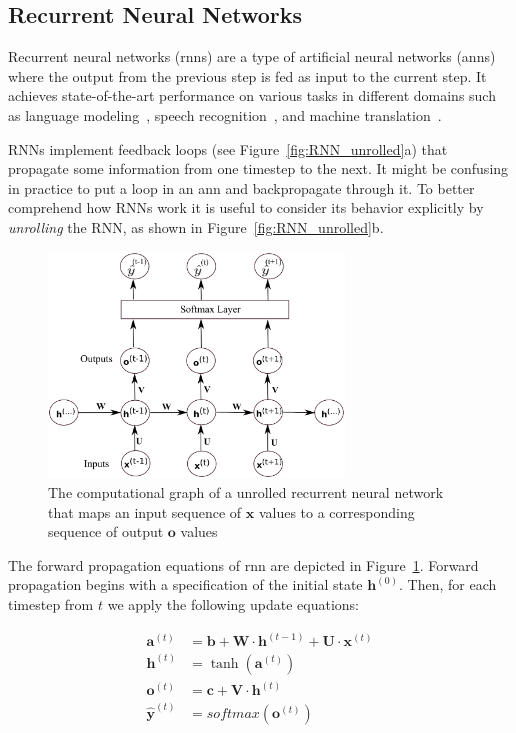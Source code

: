 \subsection{Recurrent Neural Networks} 
Recurrent neural networks (\gls{rnn}s) are a type of artificial neural networks (\gls{ann}s) where the output from the previous step is fed as input to the current step. It achieves state-of-the-art performance on various tasks in different domains such as language modeling~\cite{mikolov_12}, speech recognition~\cite{graves_13}, and machine translation~\cite{kal_13}.  

RNNs implement feedback loops (see Figure~\ref{fig:RNN_unrolled}a) that propagate some information from one timestep to the next. It might be confusing in practice to put a loop in an \gls{ann} and backpropagate through it. To better comprehend how RNNs work it is useful to consider its behavior explicitly by \emph{unrolling} the RNN, as shown in Figure~\ref{fig:RNN_unrolled}b.



\begin{figure}
	\centering
	\includegraphics[width=0.7\textwidth]{figures/rnn_unrolling.eps}
	\caption{The computational graph of a unrolled recurrent neural network that maps an input sequence of $ \textbf{x}$ values to a corresponding sequence of output $\textbf{o}$ values \label{fig:RNN_unrolling}}
\end{figure}

The forward propagation equations of \gls{rnn} are depicted in Figure~\ref{fig:RNN_unrolling}. Forward propagation begins with a specification of the initial state $ \textbf{h}^{(0)} $. Then, for each timestep from $ t $ we apply the following update equations:

\begin{equation} \label{rnn_unroll}
\begin{split}
	\textbf{a}^{(t)} &= \textbf{b} + \textbf{W} \cdot \textbf{h}^{(t-1)} + \textbf{U} \cdot \textbf{x}^{(t)} \\
	\textbf{h}^{(t)}&=\tanh(\textbf{a}^{(t)})\\
	\textbf{o}^{(t)}&= \textbf{c} + \textbf{V} \cdot \textbf{h}^{(t)} \\
	{\hat{\textbf{y}}}^{(t)} &= softmax(\textbf{o}^{(t)})
\end{split}
\end{equation}

